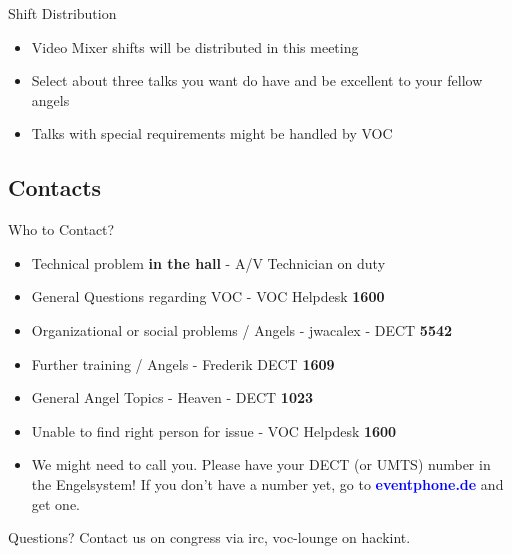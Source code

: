 \documentclass[aspectratio=169]{beamer}
\begin{document}
\begin{frame}{Shift Distribution}		%
\begin{itemize}
	\item Video Mixer shifts will be distributed in this meeting
	\item Select about three talks you want do have and be excellent to your fellow angels
	\item Talks with special requirements might be handled by VOC
\end{itemize} 
\end{frame}

\subsection{Contacts}			%
\begin{frame}{Who to Contact?}
\begin{itemize}
	\item Technical problem \textbf{in the hall} - A/V Technician on duty
	\item General Questions regarding VOC - VOC Helpdesk \textbf{1600}
	\item Organizational or social problems / Angels - jwacalex - DECT \textbf{5542}
	\item Further training / Angels - Frederik DECT \textbf{1609}
	\item General Angel Topics - Heaven - DECT \textbf{1023}
	\item Unable to find right person for issue - VOC Helpdesk \textbf{1600}
	\item We might need to call you. Please have your DECT (or UMTS) number in the Engelsystem! If you don't have a number yet, go to 
	\textcolor{blue}{\textbf{eventphone.de}} and get one. 
\end{itemize} 
\end{frame}

\begin{frame}{Questions?}
Contact us on congress via irc, voc-lounge on hackint.
\end{frame}
\end{document}
